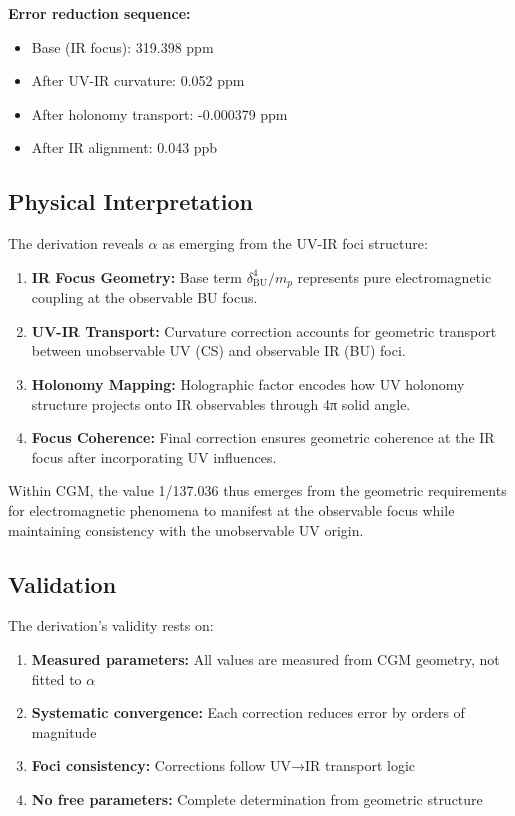 \documentclass[11pt,a4paper]{article}
\theoremstyle{definition}
\theoremstyle{remark}
\begin{document}
\textbf{Error reduction sequence:}
\begin{itemize}
\item Base (IR focus): 319.398 ppm
\item After UV-IR curvature: 0.052 ppm
\item After holonomy transport: -0.000379 ppm
\item After IR alignment: 0.043 ppb
\end{itemize}

\subsection{Physical Interpretation}

The derivation reveals $\alpha$ as emerging from the UV-IR foci structure:

\begin{enumerate}
\item \textbf{IR Focus Geometry:} Base term $\delta_{\mathrm{BU}}^4/m_p$ represents pure electromagnetic coupling at the observable BU focus.

\item \textbf{UV-IR Transport:} Curvature correction accounts for geometric transport between unobservable UV (CS) and observable IR (BU) foci.

\item \textbf{Holonomy Mapping:} Holographic factor encodes how UV holonomy structure projects onto IR observables through 4π solid angle.

\item \textbf{Focus Coherence:} Final correction ensures geometric coherence at the IR focus after incorporating UV influences.
\end{enumerate}

Within CGM, the value 1/137.036 thus emerges from the geometric requirements for electromagnetic phenomena to manifest at the observable focus while maintaining consistency with the unobservable UV origin.

\subsection{Validation}

The derivation's validity rests on:

\begin{enumerate}
\item \textbf{Measured parameters:} All values are measured from CGM geometry, not fitted to $\alpha$
\item \textbf{Systematic convergence:} Each correction reduces error by orders of magnitude
\item \textbf{Foci consistency:} Corrections follow UV→IR transport logic
\item \textbf{No free parameters:} Complete determination from geometric structure
\end{enumerate}
\end{document}
